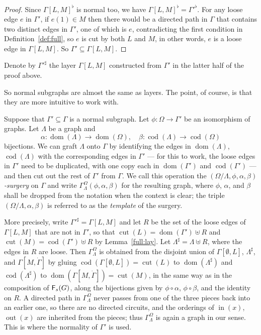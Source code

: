 \documentclass[12pt]{amsart}
\theoremstyle{plain}
\theoremstyle{definition}
\theoremstyle{remark}
\numberwithin{equation}{section}
\theoremstyle{plain}
\DeclareMathOperator{\dom}{dom}
\DeclareMathOperator{\cod}{cod}
\newcommand{\0}{\emptyset}
\newcommand{\fun}{\longrightarrow}
\newcommand{\sub}{\subseteq}
\DeclareMathOperator{\out}{out}
\newcommand{\cat}[1]{\textup{\textsf{#1}}}
\newcommand{\memph}[1]{{\color{magenta}\emph{#1}}}
\DeclareMathOperator{\inn}{in}
\DeclareMathOperator{\cut}{cut}
\begin{document}
\begin{proof}
Since $\Gamma[L, M]^{\flat}$ is normal too, we have $\Gamma[L, M]^{\flat} = \Gamma'^{\flat}$. For any loose edge $e$ in $\Gamma'$, if $e(1) \in M$ then there would be a directed path in $\Gamma$ that contains two distinct edges in $\Gamma'$, one of which is $e$,  contradicting the first condition in Definition~\ref{def:full}, so  $e$ is cut by both $L$ and $M$, in other words, $e$ is a loose edge in $\Gamma[L, M]$. So $\Gamma' \sub \Gamma[L, M]$.
\end{proof}

Denote by $\Gamma'^{\sharp}$ the layer $\Gamma[L, M]$ constructed from $\Gamma'$ in the latter half of the proof above.

So normal subgraphs are almost the same as layers. The point, of course, is that they are more intuitive to work with.

Suppose that $\Gamma' \sub \Gamma$ is a normal subgraph. Let $\phi : \Omega \fun \Gamma'$ be an isomorphism of  graphs. Let $\Lambda$ be a  graph and
\[
\alpha : \dom(\Lambda) \fun \dom(\Omega), \quad \beta: \cod(\Lambda) \fun \cod(\Omega)
\]
bijections. We can graft $\Lambda$ onto $\Gamma$ by identifying the edges in $\dom(\Lambda)$, $\cod(\Lambda)$ with the corresponding edges in $\Gamma'$ --- for this to work, the loose edges in $\Gamma'$ need to be duplicated, with one copy each in $\dom(\Gamma')$ and $\cod(\Gamma')$ ---  and then cut out the rest of $\Gamma'$ from $\Gamma$. We call this operation the \memph{$(\Omega / \Lambda, \phi, \alpha, \beta)$-surgery} on $\Gamma$ and write $\Gamma^\Omega_\Lambda(\phi, \alpha, \beta)$ for the resulting graph, where $\phi$, $\alpha$, and $\beta$ shall be dropped from the notation when the context is clear; the triple $(\Omega / \Lambda, \alpha, \beta)$ is referred to as the \memph{template} of the surgery.

More precisely, write $\Gamma'^{\sharp} = \Gamma[L, M]$ and let $R$ be the set of the loose edges of $\Gamma[L, M]$ that are not in $\Gamma'$, so that $\cut(L) = \dom(\Gamma') \uplus R$ and $\cut(M) = \cod(\Gamma') \uplus R$ by Lemma~\ref{full:lay}. Let $\Lambda^{\sharp} = \Lambda \uplus R$, where the edges in $R$ are loose. Then $\Gamma^\Omega_\Lambda$ is obtained from the disjoint union of $\Gamma[\0, L]$, $\Lambda^{\sharp}$, and $\Gamma[M, \dot \Gamma]$ by gluing $\cod(\Gamma[\0, L]) = \cut(L)$ to $\dom(\Lambda^{\sharp})$ and $\cod(\Lambda^{\sharp})$ to $\dom(\Gamma[M, \dot \Gamma]) = \cut(M)$, in the same way as in the composition of $\cat F_s(G)$, along the bijections given by $\phi \circ \alpha$, $\phi \circ \beta$, and the identity on $R$. A directed path in $\Gamma^\Omega_\Lambda$ never passes from one of the three pieces back into an earlier one, so there are no directed circuits, and the orderings of $\inn(x)$, $\out(x)$ are inherited from the pieces; thus $\Gamma^\Omega_\Lambda$ is again a graph in our sense. This is where the normality of $\Gamma'$ is used.
\end{document}
